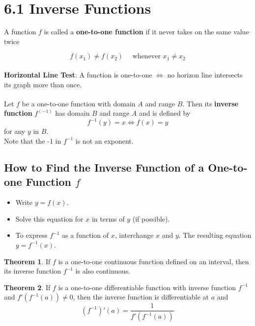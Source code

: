 %
%

\section*{6.1 Inverse Functions}

\theoremstyle{definition}
\newtheorem*{definition}{Theorem}

A function \(f\) is called a \textbf{one-to-one function} if it never takes on the same value twice

\[ f(x_1) \neq f(x_2) \quad \text{ whenever } x_1 \neq x_2 \]
\\
\textbf{Horizontal Line Test}: A function is one-to-one \( \Longleftrightarrow \) no horizon line intersects its graph more than once.
\\
\\
Let \(f\) be a one-to-one function with domain \(A\) and range \(B\). Then its \textbf{inverse function} \(f^(-1)\) has domain \(B\) and range \(A\) and is defined by
\[ f^{-1}(y)=x \Leftrightarrow f(x)=y \]
for any \(y\) in \(B\).
\\
Note that the -1 in \(f^{-1}\) is not an exponent.

\subsection*{How to Find the Inverse Function of a One-to-one Function \(f\)}

\begin{itemize}
  \item Write \( y=f(x) \).
  \item Solve this equation for \(x\) in terms of \(y\) (if possible).
  \item To express \(f^{-1}\) as a function of \(x\), interchange \(x\) and \(y\). The resulting equation \(y=f^{-1}(x)\).
\end{itemize}

\begin{definition}
If \(f\) is a one-to-one continuous function defined on an interval, then its inverse function \(f^{-1}\) is also continuous.
\end{definition}

\begin{definition}
If \(f\) is a one-to-one differentiable function with inverse function \( f^{-1}\) and \(f'(f^{-1}(a)) \neq 0 \), then the inverse function is differentiable at \(a\) and 
\[ (f^{-1})'(a) = \frac{1}{f'(f^{-1}(a))} \]
\end{definition}
